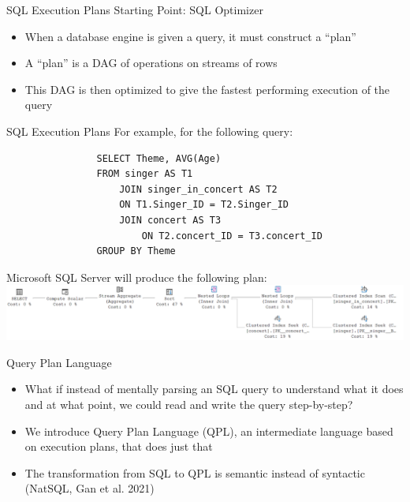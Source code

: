 \documentclass{beamer}
\begin{document}
\begin{frame}{SQL Execution Plans}
    Starting Point: SQL Optimizer
    \begin{itemize}
        \item When a database engine is given a query, it must construct a ``plan''
        \item A ``plan'' is a DAG of operations on streams of rows
        \item This DAG is then optimized to give the fastest performing execution of the query
    \end{itemize}
\end{frame}

\begin{frame}[fragile]{SQL Execution Plans}
    For example, for the following query:

    \begin{verbatim}
                SELECT Theme, AVG(Age)
                FROM singer AS T1
                    JOIN singer_in_concert AS T2
                	ON T1.Singer_ID = T2.Singer_ID
                    JOIN concert AS T3
                        ON T2.concert_ID = T3.concert_ID
                GROUP BY Theme
    \end{verbatim}

    \vfill

    Microsoft SQL Server will produce the following plan:\\

    \includegraphics[width=\textwidth]{exec-plan.png}
\end{frame}

\begin{frame}{Query Plan Language}
    \begin{itemize}
        \item What if instead of mentally parsing an SQL query to understand what it does and at what point, we could read and write the query step-by-step?
        \item We introduce Query Plan Language (QPL), an intermediate language based on execution plans, that does just that
        \item The transformation from SQL to QPL is semantic instead of syntactic (NatSQL, Gan et al. 2021)
    \end{itemize}
\end{frame}
\end{document}
